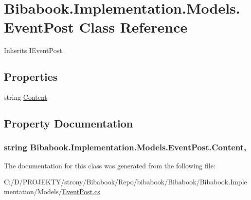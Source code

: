 \hypertarget{class_bibabook_1_1_implementation_1_1_models_1_1_event_post}{}\section{Bibabook.\+Implementation.\+Models.\+Event\+Post Class Reference}
\label{class_bibabook_1_1_implementation_1_1_models_1_1_event_post}


Inherits I\+Event\+Post.

\subsection*{Properties}
\begin{DoxyCompactItemize}
\item 
string \hyperlink{class_bibabook_1_1_implementation_1_1_models_1_1_event_post_a7a2dfebf9805e262a2843d5d949d2280}{Content}
\end{DoxyCompactItemize}


\subsection{Property Documentation}
\hypertarget{class_bibabook_1_1_implementation_1_1_models_1_1_event_post_a7a2dfebf9805e262a2843d5d949d2280}{}
\subsubsection[{Content}]{\setlength{\rightskip}{0pt plus 5cm}string Bibabook.\+Implementation.\+Models.\+Event\+Post.\+Content\hspace{0.3cm}{\ttfamily [get]}, {\ttfamily [set]}}\label{class_bibabook_1_1_implementation_1_1_models_1_1_event_post_a7a2dfebf9805e262a2843d5d949d2280}


The documentation for this class was generated from the following file\+:\begin{DoxyCompactItemize}
\item 
C\+:/\+D/\+P\+R\+O\+J\+E\+K\+T\+Y/strony/\+Bibabook/\+Repo/bibabook/\+Bibabook/\+Bibabook.\+Implementation/\+Models/\hyperlink{_event_post_8cs}{Event\+Post.\+cs}\end{DoxyCompactItemize}
